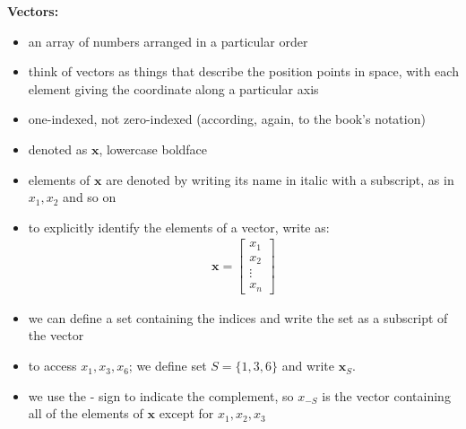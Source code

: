 \documentclass[11pt,twocolumn]{report}
\begin{document}
\large\textbf{Vectors:}
\begin{itemize}
  \item an array of numbers arranged in a particular order
  \item think of vectors as things that describe the position points in space,
    with each element giving the coordinate along a particular axis
  \item one-indexed, not zero-indexed (according, again, to the book's notation)
  \item denoted as $\bm{x}$, lowercase boldface
  \item elements of $\bm{x}$ are denoted by writing its name in italic with a
    subscript, as in \textbf{$x_1, x_2$} and so on
  \item to explicitly identify the elements of a vector, write as:
    \begin{gather}
      \bm{x} = 
      \begin{bmatrix}
        x_1\\
        x_2\\
        \vdots\\
        x_n
      \end{bmatrix}
    \end{gather}
  \item we can define a set containing the indices and write the set as a
    subscript of the vector 
  \item to access $x_1, x_3, x_6$; we define set $S = \{1, 3, 6\}$ and write
    $\bm{x}_S$.
  \item we use the - sign to indicate the complement, so $x_{-S}$ is the vector
    containing all of the elements of $\bm{x}$ except for $x_1, x_2, x_3$
\end{itemize}
\end{document}
